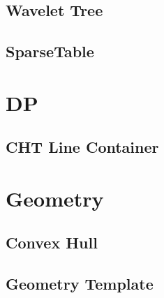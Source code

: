 \subsection{Wavelet Tree}
\vspace{-2.3ex}
\raggedbottom
\vspace{-3.3ex}
\hrulefill
\vspace{-1ex}
\subsection{SparseTable}
\vspace{-2.3ex}
\raggedbottom
\vspace{-3.3ex}
\hrulefill

\section{DP}
\vspace{-1ex}
\subsection{CHT Line Container}
\vspace{-2.3ex}
\raggedbottom
\vspace{-3.3ex}
\hrulefill

\section{Geometry}
\vspace{-1ex}
\subsection{Convex Hull}
\vspace{-2.3ex}
\raggedbottom
\vspace{-3.3ex}
\hrulefill
\vspace{-1ex}
\subsection{Geometry Template}
\vspace{-2.3ex}
\raggedbottom
\vspace{-3.3ex}
\hrulefill
\vspace{-1ex}
